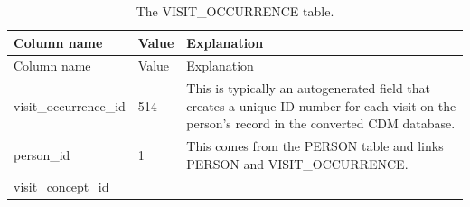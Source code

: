 \documentclass[11pt]{book}
\theoremstyle{definition}
\theoremstyle{definition}
\theoremstyle{definition}
\theoremstyle{remark}
\begin{document}
\begin{longtable}[]{@{}lll@{}}
\caption{\label{tab:visitOccurrence} The VISIT\_OCCURRENCE table.}\tabularnewline
\toprule
\begin{minipage}[b]{0.28\columnwidth}\raggedright
Column name\strut
\end{minipage} & \begin{minipage}[b]{0.15\columnwidth}\raggedright
Value\strut
\end{minipage} & \begin{minipage}[b]{0.49\columnwidth}\raggedright
Explanation\strut
\end{minipage}\tabularnewline
\midrule
\endfirsthead
\toprule
\begin{minipage}[b]{0.28\columnwidth}\raggedright
Column name\strut
\end{minipage} & \begin{minipage}[b]{0.15\columnwidth}\raggedright
Value\strut
\end{minipage} & \begin{minipage}[b]{0.49\columnwidth}\raggedright
Explanation\strut
\end{minipage}\tabularnewline
\midrule
\endhead
\begin{minipage}[t]{0.28\columnwidth}\raggedright
visit\_occurrence\_id\strut
\end{minipage} & \begin{minipage}[t]{0.15\columnwidth}\raggedright
514\strut
\end{minipage} & \begin{minipage}[t]{0.49\columnwidth}\raggedright
This is typically an autogenerated field that creates a unique ID number for each visit on the person's record in the converted CDM database.\strut
\end{minipage}\tabularnewline
\begin{minipage}[t]{0.28\columnwidth}\raggedright
person\_id\strut
\end{minipage} & \begin{minipage}[t]{0.15\columnwidth}\raggedright
1\strut
\end{minipage} & \begin{minipage}[t]{0.49\columnwidth}\raggedright
This comes from the PERSON table and links PERSON and VISIT\_OCCURRENCE.\strut
\end{minipage}\tabularnewline
\begin{minipage}[t]{0.28\columnwidth}\raggedright
visit\_concept\_id\strut
\end{minipage} & \begin{minipage}[t]{0.15\columnwidth}\raggedright

\end{minipage}
\end{longtable}
\end{document}
